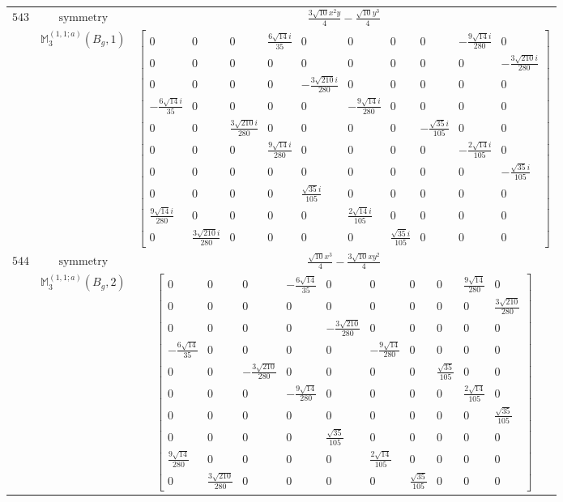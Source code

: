 \documentclass[fleqn,8pt,landscape]{jsarticle}
\begin{document}
\begin{longtable}{ccc}
$ 543 $ & $ \text{symmetry} $ & $ \frac{3 \sqrt{10} x^{2} y}{4} - \frac{\sqrt{10} y^{3}}{4} $ \\
$  $ & $ \mathbb{M}_{3}^{(1,1;a)}(B_{g},1) $ & $ \begin{bmatrix} 0 & 0 & 0 & \frac{6 \sqrt{14} i}{35} & 0 & 0 & 0 & 0 & - \frac{9 \sqrt{14} i}{280} & 0 \\ 0 & 0 & 0 & 0 & 0 & 0 & 0 & 0 & 0 & - \frac{3 \sqrt{210} i}{280} \\ 0 & 0 & 0 & 0 & - \frac{3 \sqrt{210} i}{280} & 0 & 0 & 0 & 0 & 0 \\ - \frac{6 \sqrt{14} i}{35} & 0 & 0 & 0 & 0 & - \frac{9 \sqrt{14} i}{280} & 0 & 0 & 0 & 0 \\ 0 & 0 & \frac{3 \sqrt{210} i}{280} & 0 & 0 & 0 & 0 & - \frac{\sqrt{35} i}{105} & 0 & 0 \\ 0 & 0 & 0 & \frac{9 \sqrt{14} i}{280} & 0 & 0 & 0 & 0 & - \frac{2 \sqrt{14} i}{105} & 0 \\ 0 & 0 & 0 & 0 & 0 & 0 & 0 & 0 & 0 & - \frac{\sqrt{35} i}{105} \\ 0 & 0 & 0 & 0 & \frac{\sqrt{35} i}{105} & 0 & 0 & 0 & 0 & 0 \\ \frac{9 \sqrt{14} i}{280} & 0 & 0 & 0 & 0 & \frac{2 \sqrt{14} i}{105} & 0 & 0 & 0 & 0 \\ 0 & \frac{3 \sqrt{210} i}{280} & 0 & 0 & 0 & 0 & \frac{\sqrt{35} i}{105} & 0 & 0 & 0 \end{bmatrix} $ \\ \hline
$ 544 $ & $ \text{symmetry} $ & $ \frac{\sqrt{10} x^{3}}{4} - \frac{3 \sqrt{10} x y^{2}}{4} $ \\
$  $ & $ \mathbb{M}_{3}^{(1,1;a)}(B_{g},2) $ & $ \begin{bmatrix} 0 & 0 & 0 & - \frac{6 \sqrt{14}}{35} & 0 & 0 & 0 & 0 & \frac{9 \sqrt{14}}{280} & 0 \\ 0 & 0 & 0 & 0 & 0 & 0 & 0 & 0 & 0 & \frac{3 \sqrt{210}}{280} \\ 0 & 0 & 0 & 0 & - \frac{3 \sqrt{210}}{280} & 0 & 0 & 0 & 0 & 0 \\ - \frac{6 \sqrt{14}}{35} & 0 & 0 & 0 & 0 & - \frac{9 \sqrt{14}}{280} & 0 & 0 & 0 & 0 \\ 0 & 0 & - \frac{3 \sqrt{210}}{280} & 0 & 0 & 0 & 0 & \frac{\sqrt{35}}{105} & 0 & 0 \\ 0 & 0 & 0 & - \frac{9 \sqrt{14}}{280} & 0 & 0 & 0 & 0 & \frac{2 \sqrt{14}}{105} & 0 \\ 0 & 0 & 0 & 0 & 0 & 0 & 0 & 0 & 0 & \frac{\sqrt{35}}{105} \\ 0 & 0 & 0 & 0 & \frac{\sqrt{35}}{105} & 0 & 0 & 0 & 0 & 0 \\ \frac{9 \sqrt{14}}{280} & 0 & 0 & 0 & 0 & \frac{2 \sqrt{14}}{105} & 0 & 0 & 0 & 0 \\ 0 & \frac{3 \sqrt{210}}{280} & 0 & 0 & 0 & 0 & \frac{\sqrt{35}}{105} & 0 & 0 & 0 \end{bmatrix} $ \\ \hline

\end{longtable}
\end{document}
